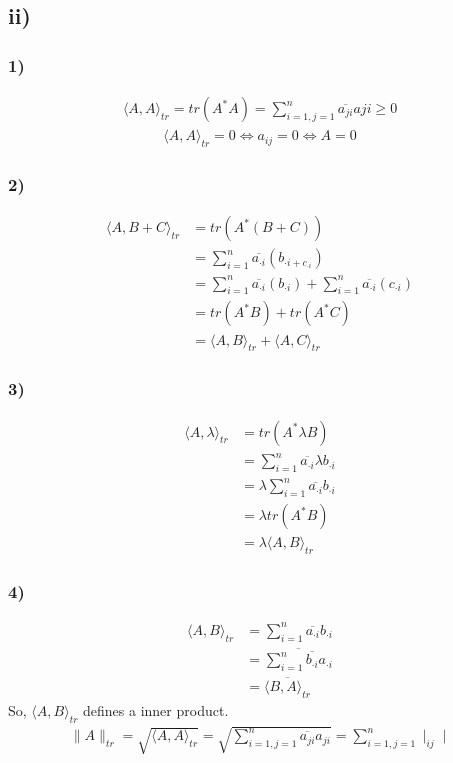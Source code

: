 \documentclass{article}
\begin{document}
\subsection*{ii)}
\subsubsection*{1)}
\begin{align*}
\langle A,A\rangle_{tr}=tr(A^*A)=\displaystyle\sum^n_{i=1,j=1}\overline{a_{ji}}a{ji}\geq 0
\end{align*}
\begin{align*}
\langle A,A\rangle_{tr}=0\Longleftrightarrow a_{ij}=0\Longleftrightarrow A=0
\end{align*}
\subsubsection*{2)}
\begin{align*}
\langle A,B+C\rangle_{tr}&=tr(A^*(B+C))\\
&=\displaystyle\sum^n_{i=1}\overline{a_{\cdot i}}(b_{\cdot i+c_{\cdot i}})\\
&=\displaystyle\sum^n_{i=1}\overline{a_{\cdot i}}(b_{\cdot i})+\displaystyle\sum^n_{i=1}\overline{a_{\cdot i}}(c_{\cdot i})\\
&=tr(A^*B)+tr(A^*C)\\
&=\langle A,B\rangle_{tr}+\langle A,C\rangle_{tr}
\end{align*}
\subsubsection*{3)}
\begin{align*}
\langle A,\lambda\rangle_{tr}&=tr(A^*\lambda B)\\
&=\displaystyle\sum^n_{i=1}\overline{a_{\cdot i}}\lambda b_{\cdot i}\\
&=\lambda\displaystyle\sum^n_{i=1}\overline{a_{\cdot i}} b_{\cdot i}\\
&=\lambda tr(A^*B)\\
&=\lambda\langle A,B\rangle_{tr}
\end{align*}
\subsubsection*{4)}
\begin{align*}
\langle A,B\rangle_{tr}&=\displaystyle\sum^n_{i=1}\overline{a_{\cdot i}}b_{\cdot i}\\
&=\overline{\displaystyle\sum^n_{i=1}\overline{b_{\cdot i}}a_{\cdot i}}\\
&=\overline{\langle B,A\rangle_{tr}}
\end{align*}
So, $\langle A,B\rangle_{tr}$ defines a inner product.
\begin{align*}
\parallel A\parallel_{tr}=\sqrt{\langle A,A\rangle_{tr}}=\sqrt{\displaystyle\sum_{i=1,j=1}^n\overline{a_{ji}}a_{ji}}=\displaystyle\sum_{i=1,j=1}^n\mid_{ij}\mid
\end{align*}
\end{document}

